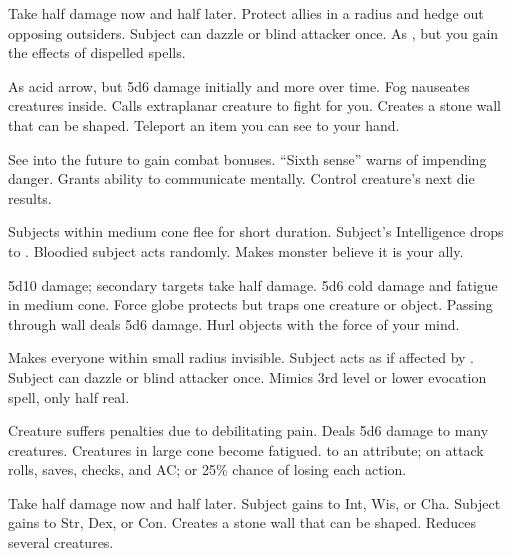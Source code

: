 \begin{swspelllist}
   Take half damage now and half later. 
   Protect allies in a \areamed radius and hedge out opposing outsiders.
   Subject can dazzle or blind attacker once.
   As , but you gain the effects of dispelled spells.

   As acid arrow, but 5d6 damage initially and more over time.
   Fog nauseates creatures inside.
   Calls extraplanar creature to fight for you.
   Creates a stone wall that can be shaped.
   Teleport an item you can see to your hand.

   See into the future to gain combat bonuses.
   ``Sixth sense'' warns of impending danger.
   Grants ability to communicate mentally. 
   Control creature's next die results.

   Subjects within medium cone flee for short duration.
   Subject's Intelligence drops to .
   Bloodied subject acts randomly.
   Makes monster believe it is your ally.

   5d10 damage; secondary targets take half damage.
   5d6 cold damage and fatigue in medium cone.
   Force globe protects but traps one creature or object.
   Passing through wall deals 5d6 damage.
   Hurl objects with the force of your mind.

   Makes everyone within small radius invisible.
   Subject acts as if affected by .
   Subject can dazzle or blind attacker once.
   Mimics 3rd level or lower evocation spell, only half real.

   Creature suffers penalties due to debilitating pain.
   Deals 5d6 damage to many creatures.
   Creatures in large cone become fatigued.
    to an attribute;  on attack rolls, saves, checks, and AC; or 25\% chance of losing each action.

   Take half damage now and half later. 
   Subject gains  to Int, Wis, or Cha.
   Subject gains  to Str, Dex, or Con.
   Creates a stone wall that can be shaped.
   Reduces several creatures.
\end{swspelllist}

